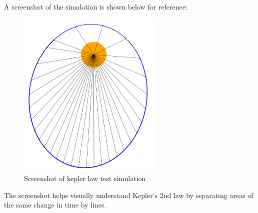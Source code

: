 A screenshot of the simulation is shown below for reference:

\begin{figure}[h] 
	\centering
		\includegraphics[width=7cm]{Figures/keplerscreenshot.png}
	\caption{Screenshot of kepler law test simulation}
	\label{fig:sun1}
\end{figure}

The screenshot helps visually understand Kepler's 2nd law by separating areas of the same change in time by lines.





























